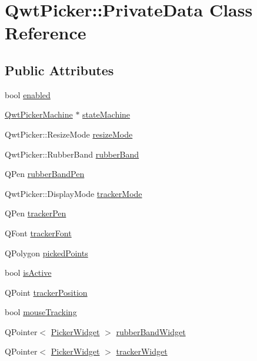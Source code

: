 \hypertarget{class_qwt_picker_1_1_private_data}{\section{Qwt\-Picker\-:\-:Private\-Data Class Reference}
\label{class_qwt_picker_1_1_private_data}
}
\subsection*{Public Attributes}
\begin{DoxyCompactItemize}
\item 
bool \hyperlink{class_qwt_picker_1_1_private_data_ab93a9a6c04e5bf1fa85320b748b31acf}{enabled}
\item 
\hyperlink{class_qwt_picker_machine}{Qwt\-Picker\-Machine} $\ast$ \hyperlink{class_qwt_picker_1_1_private_data_a4740c1988aa42a22237b9e2920845d4c}{state\-Machine}
\item 
Qwt\-Picker\-::\-Resize\-Mode \hyperlink{class_qwt_picker_1_1_private_data_a300c51c55b58d203e3fd2e4eff48e9dc}{resize\-Mode}
\item 
Qwt\-Picker\-::\-Rubber\-Band \hyperlink{class_qwt_picker_1_1_private_data_ab22bf69d05d50292b7f831617215f177}{rubber\-Band}
\item 
Q\-Pen \hyperlink{class_qwt_picker_1_1_private_data_ae1102efd6269f5381e00af1bd551c592}{rubber\-Band\-Pen}
\item 
Qwt\-Picker\-::\-Display\-Mode \hyperlink{class_qwt_picker_1_1_private_data_a623a09fcc8836448b1c73239a8e48a09}{tracker\-Mode}
\item 
Q\-Pen \hyperlink{class_qwt_picker_1_1_private_data_ae3a116d09a5ca75c1907e1f8626dff46}{tracker\-Pen}
\item 
Q\-Font \hyperlink{class_qwt_picker_1_1_private_data_a344744e98d6db33af4075055bf028807}{tracker\-Font}
\item 
Q\-Polygon \hyperlink{class_qwt_picker_1_1_private_data_a43ab0eb4137aafcbd1f6c7c139c5ddea}{picked\-Points}
\item 
bool \hyperlink{class_qwt_picker_1_1_private_data_a9d2e98c1b11757a80d77c564cca8e2e3}{is\-Active}
\item 
Q\-Point \hyperlink{class_qwt_picker_1_1_private_data_a775c3c8e66d084169dd39808b6986087}{tracker\-Position}
\item 
bool \hyperlink{class_qwt_picker_1_1_private_data_aa580a96bd2d1d392fb903c7a846fba76}{mouse\-Tracking}
\item 
Q\-Pointer$<$ \hyperlink{class_qwt_picker_1_1_picker_widget}{Picker\-Widget} $>$ \hyperlink{class_qwt_picker_1_1_private_data_ae6cb698dbc93e67852cc2c8b16c83b97}{rubber\-Band\-Widget}
\item 
Q\-Pointer$<$ \hyperlink{class_qwt_picker_1_1_picker_widget}{Picker\-Widget} $>$ \hyperlink{class_qwt_picker_1_1_private_data_a09596dc058e68d208622e136c3dd9b6e}{tracker\-Widget}
\end{DoxyCompactItemize}


